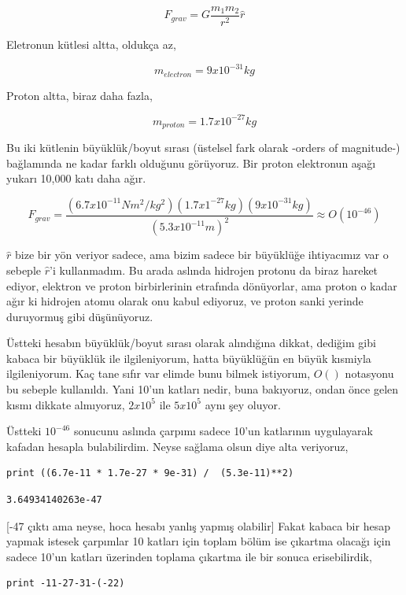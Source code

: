 \documentclass[12pt,fleqn]{article}\usepackage{../../common}
\begin{document}
$$ F_{grav} = G \frac{m_1 m_2}{r^2} \hat{r}$$

Eletronun kütlesi altta, oldukça az,

$$ m_{electron} = 9 x 10^{-31} kg $$

Proton altta, biraz daha fazla,

$$ m_{proton} = 1.7 x 10^{-27} kg $$

Bu iki kütlenin büyüklük/boyut sırası (üstelsel fark olarak -orders of
magnitude-) bağlamında ne kadar farklı olduğunu görüyoruz. Bir proton elektronun
aşağı yukarı 10,000 katı daha ağır.

$$
F_{grav} =
\frac{ (6.7 x 10^{-11} Nm^2 / kg^2) (1.7 x 1^{-27} kg) (9 x 10^{-31} kg) }
     { (5.3 x 10^{-11} m)^2 }
\approx O(10^{-46})    
$$

$\hat{r}$ bize bir yön veriyor sadece, ama bizim sadece bir büyüklüğe
ihtiyacımız var o sebeple $\hat{r}$'i kullanmadım. Bu arada aslında
hidrojen protonu da biraz hareket ediyor, elektron ve proton birbirlerinin
etrafında dönüyorlar, ama proton o kadar ağır ki hidrojen atomu olarak onu
kabul ediyoruz, ve proton sanki yerinde duruyormuş gibi düşünüyoruz.

Üstteki hesabın büyüklük/boyut sırası olarak alındığına dikkat, dediğim
gibi kabaca bir büyüklük ile ilgileniyorum, hatta büyüklüğün en büyük
kısmiyla ilgileniyorum. Kaç tane sıfır var elimde bunu bilmek istiyorum,
$O()$ notasyonu bu sebeple kullanıldı. Yani 10'un katları nedir, buna
bakıyoruz, ondan önce gelen kısmı dikkate almıyoruz, $2 x 10^{5}$ ile
$5 x 10^{5}$ aynı şey oluyor.

Üstteki $10^{-46}$ sonucunu aslında çarpımı sadece 10'un katlarının
uygulayarak kafadan hesapla bulabilirdim. Neyse sağlama olsun diye alta
veriyoruz,

\begin{verbatim}
print ((6.7e-11 * 1.7e-27 * 9e-31) /  (5.3e-11)**2)
\end{verbatim}

\begin{verbatim}
3.64934140263e-47
\end{verbatim}

[-47 çıktı ama neyse, hoca hesabı yanlış yapmış olabilir] Fakat kabaca bir
hesap yapmak istesek çarpımlar 10 katları için toplam bölüm ise çıkartma
olacağı için sadece 10'un katları üzerinden toplama çıkartma ile bir sonuca
erisebilirdik,

\begin{verbatim}
print -11-27-31-(-22)
\end{verbatim}
\end{document}
